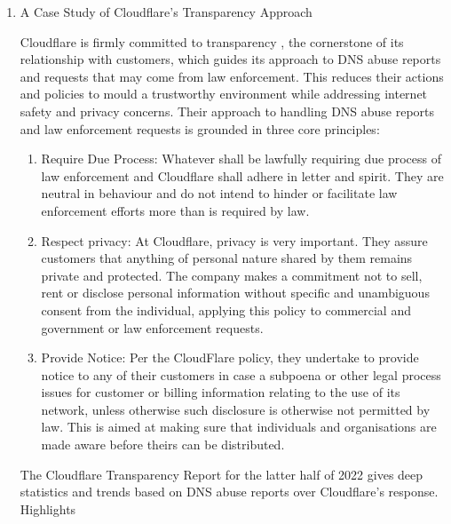 \begin{enumerate}
    \item A Case Study of Cloudflare's Transparency Approach


Cloudflare is firmly committed to transparency \cite{cloudflare_transparency_2022}, the cornerstone of its relationship with customers, which guides its approach to DNS abuse reports and requests that may come from law enforcement. This reduces their actions and policies to mould a trustworthy environment while addressing internet safety and privacy concerns. Their approach to handling DNS abuse reports and law enforcement requests is grounded in three core principles:

\begin{enumerate}
    \item Require Due Process:  Whatever shall be lawfully requiring due process of law enforcement and Cloudflare shall adhere in letter and spirit. They are neutral in behaviour and do not intend to hinder or facilitate law enforcement efforts more than is required by law.
    \item Respect privacy: At Cloudflare, privacy is very important. They assure customers that anything of personal nature shared by them remains private and protected. The company makes a commitment not to sell, rent or disclose personal information without specific and unambiguous consent from the individual, applying this policy to commercial and government or law enforcement requests.
    \item Provide Notice: Per the CloudFlare policy, they undertake to provide notice to any of their customers in case a subpoena or other legal process issues for customer or billing information relating to the use of its network, unless otherwise such disclosure is otherwise not permitted by law. This is aimed at making sure that individuals and organisations are made aware before theirs can be distributed.
\end{enumerate}

The Cloudflare Transparency Report for the latter half of 2022 gives deep statistics and trends based on DNS abuse reports over Cloudflare's response. Highlights


\end{enumerate}
